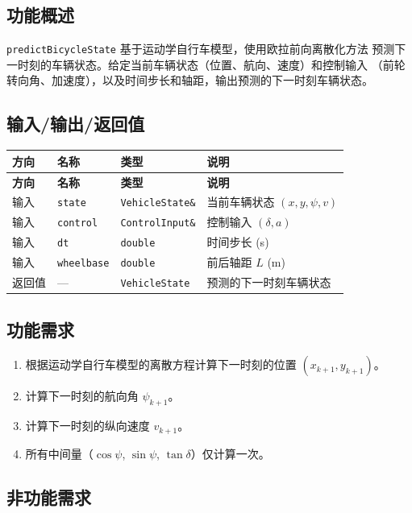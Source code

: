\documentclass[a4paper,10pt]{article}
\begin{document}
\subsection{功能概述}

\texttt{predictBicycleState} 基于运动学自行车模型，使用欧拉前向离散化方法
预测下一时刻的车辆状态。给定当前车辆状态（位置、航向、速度）和控制输入
（前轮转向角、加速度），以及时间步长和轴距，输出预测的下一时刻车辆状态。

\subsection{输入/输出/返回值}

\renewcommand{\arraystretch}{1.3}
\begin{longtable}{|L{2.2cm}|L{3cm}|C{2.5cm}|L{7cm}|}
\hline
\textbf{方向} & \textbf{名称} & \textbf{类型} & \textbf{说明} \\
\hline
\endfirsthead
\hline
\textbf{方向} & \textbf{名称} & \textbf{类型} & \textbf{说明} \\
\hline
\endhead
输入 & \texttt{state} & \texttt{VehicleState\&} & 当前车辆状态 $(x, y, \psi, v)$ \\
\hline
输入 & \texttt{control} & \texttt{ControlInput\&} & 控制输入 $(\delta, a)$ \\
\hline
输入 & \texttt{dt} & \texttt{double} & 时间步长 (s) \\
\hline
输入 & \texttt{wheelbase} & \texttt{double} & 前后轴距 $L$ (m) \\
\hline
返回值 & --- & \texttt{VehicleState} & 预测的下一时刻车辆状态 \\
\hline
\end{longtable}

\subsection{功能需求}

\begin{enumerate}[label=FR-\arabic*]
  \item 根据运动学自行车模型的离散方程计算下一时刻的位置 $(x_{k+1}, y_{k+1})$。
  \item 计算下一时刻的航向角 $\psi_{k+1}$。
  \item 计算下一时刻的纵向速度 $v_{k+1}$。
  \item 所有中间量（$\cos\psi$, $\sin\psi$, $\tan\delta$）仅计算一次。
\end{enumerate}

\subsection{非功能需求}
\end{document}
